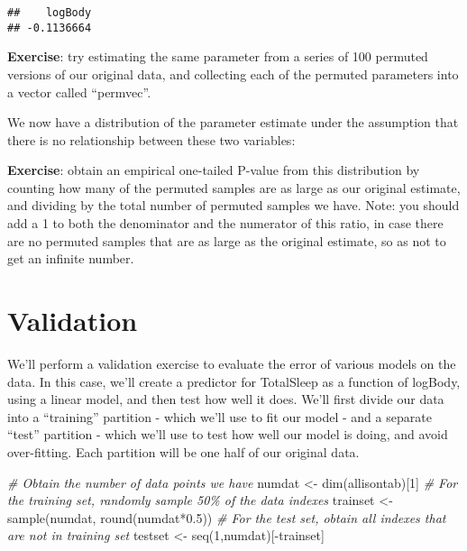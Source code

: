 \documentclass[
]{book}
\newenvironment{Shaded}{\begin{snugshade}}{\end{snugshade}}
\newcommand{\AttributeTok}[1]{\textcolor[rgb]{0.77,0.63,0.00}{#1}}
\newcommand{\CommentTok}[1]{\textcolor[rgb]{0.56,0.35,0.01}{\textit{#1}}}
\newcommand{\DecValTok}[1]{\textcolor[rgb]{0.00,0.00,0.81}{#1}}
\newcommand{\FloatTok}[1]{\textcolor[rgb]{0.00,0.00,0.81}{#1}}
\newcommand{\FunctionTok}[1]{\textcolor[rgb]{0.00,0.00,0.00}{#1}}
\newcommand{\NormalTok}[1]{#1}
\newcommand{\OtherTok}[1]{\textcolor[rgb]{0.56,0.35,0.01}{#1}}
\newcommand{\SpecialCharTok}[1]{\textcolor[rgb]{0.00,0.00,0.00}{#1}}
\begin{document}
\begin{Shaded}
\end{Shaded}

\begin{verbatim}
##    logBody 
## -0.1136664
\end{verbatim}

\textbf{Exercise}: try estimating the same parameter from a series of 100 permuted versions of our original data, and collecting each of the permuted parameters into a vector called ``permvec''.

We now have a distribution of the parameter estimate under the assumption that there is no relationship between these two variables:

\textbf{Exercise}: obtain an empirical one-tailed P-value from this distribution by counting how many of the permuted samples are as large as our original estimate, and dividing by the total number of permuted samples we have. Note: you should add a 1 to both the denominator and the numerator of this ratio, in case there are no permuted samples that are as large as the original estimate, so as not to get an infinite number.

\hypertarget{validation}{%
\section{Validation}\label{validation}}

We'll perform a validation exercise to evaluate the error of various models on the data. In this case, we'll create a predictor for TotalSleep as a function of logBody, using a linear model, and then test how well it does. We'll first divide our data into a ``training'' partition - which we'll use to fit our model - and a separate ``test'' partition - which we'll use to test how well our model is doing, and avoid over-fitting. Each partition will be one half of our original data.

\begin{Shaded}
\begin{Highlighting}[]
\CommentTok{\# Obtain the number of data points we have}
\NormalTok{numdat }\OtherTok{\textless{}{-}} \FunctionTok{dim}\NormalTok{(allisontab)[}\DecValTok{1}\NormalTok{]}
\CommentTok{\# For the training set, randomly sample 50\% of the data indexes}
\NormalTok{trainset }\OtherTok{\textless{}{-}} \FunctionTok{sample}\NormalTok{(numdat, }\FunctionTok{round}\NormalTok{(numdat}\SpecialCharTok{*}\FloatTok{0.5}\NormalTok{))}
\CommentTok{\# For the test set, obtain all indexes that are not in training set}
\NormalTok{testset }\OtherTok{\textless{}{-}} \FunctionTok{seq}\NormalTok{(}\DecValTok{1}\NormalTok{,numdat)[}\SpecialCharTok{{-}}\NormalTok{trainset]}
\end{Highlighting}
\end{Shaded}
\end{document}

